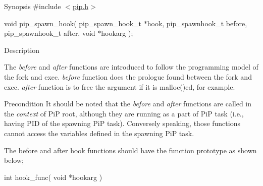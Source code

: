 \begin{DoxyParagraph}{Synopsis}
\#include $<$\hyperlink{pip_8h_source}{pip.\-h}$>$ \par
void pip\-\_\-spawn\-\_\-hook( pip\-\_\-spawn\-\_\-hook\-\_\-t $\ast$hook, pip\-\_\-spawnhook\-\_\-t before, pip\-\_\-spawnhook\-\_\-t after, void $\ast$hookarg );
\end{DoxyParagraph}
\begin{DoxyParagraph}{Description}

\end{DoxyParagraph}
The {\itshape before} and {\itshape after} functions are introduced to follow the programming model of the {\ttfamily fork} and {\ttfamily exec}. {\itshape before} function does the prologue found between the {\ttfamily fork} and {\ttfamily exec}. {\itshape after} function is to free the argument if it is {\ttfamily malloc()ed}, for example. \begin{DoxyPrecond}{Precondition}
It should be noted that the {\itshape before} and {\itshape after} functions are called in the {\itshape context} of Pi\-P root, although they are running as a part of Pi\-P task (i.\-e., having P\-I\-D of the spawning Pi\-P task). Conversely speaking, those functions cannot access the variables defined in the spawning Pi\-P task. 

The before and after hook functions should have the function prototype as shown below; 
\begin{DoxyCode}
\textcolor{keywordtype}{int} hook\_func( \textcolor{keywordtype}{void} *hookarg )
\end{DoxyCode}

\end{DoxyPrecond}

